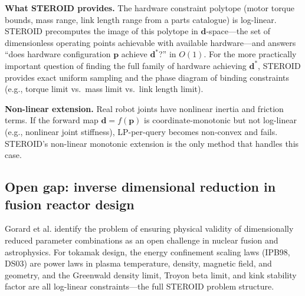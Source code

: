 \documentclass[review,onefignum,onetabnum]{./SIAM_template/siamart171218}
\begin{document}
\textbf{What STEROID provides.}
The hardware constraint polytope (motor torque bounds, mass range, link length range
from a parts catalogue) is log-linear.  STEROID precomputes the image of this polytope
in $\mathbf{d}$-space---the set of dimensionless operating points achievable with
available hardware---and answers ``does hardware configuration $\mathbf{p}$ achieve
$\mathbf{d}^*$?'' in $O(1)$.  For the more practically important question of finding
the full family of hardware achieving $\mathbf{d}^*$, STEROID provides exact uniform
sampling and the phase diagram of binding constraints (e.g., torque limit vs.\ mass
limit vs.\ link length limit).

\textbf{Non-linear extension.}
Real robot joints have nonlinear inertia and friction terms.  If the forward map
$\mathbf{d} = f(\mathbf{p})$ is coordinate-monotonic but not log-linear (e.g.,
nonlinear joint stiffness), LP-per-query becomes non-convex and fails.
STEROID's non-linear monotonic extension is the only method that handles this case.

\subsection{Open gap: inverse dimensional reduction in fusion reactor design}
\label{sec:fusion}

Gorard et al. \cite{Gorard2025} identify the problem of ensuring physical
validity of dimensionally reduced parameter combinations as an open challenge
in nuclear fusion and astrophysics.  For tokamak design, the energy confinement scaling laws (IPB98,
DS03) are power laws in plasma temperature, density, magnetic field, and geometry,
and the Greenwald density limit, Troyon beta limit, and kink stability factor are
all log-linear constraints---the full STEROID problem structure.
\end{document}
